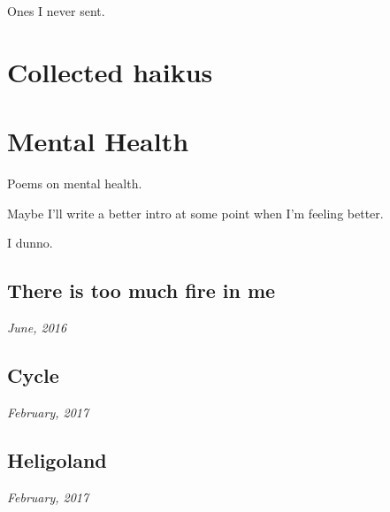 \documentclass[10pt]{memoir}
\begin{document}
  \hfill Ones I never sent.
  \thispagestyle{empty}
  \newpage


  


  \chapter{Collected haikus}
  \thispagestyle{empty}
  \newpage


  


  \chapter{Mental Health}

  Poems on mental health.

  \vfill

  \noindent Maybe I'll write a better intro at some point when I'm feeling better.

  \vfill

  \hfill I dunno.
  \thispagestyle{empty}
  \newpage


  \section{There is too much fire in me}

  \hfill\textit{June, 2016}

  
  \newpage


  \section{Cycle}

  \hfill\textit{February, 2017}

  
  \newpage


  \section{Heligoland}

  \hfill\textit{February, 2017}

  
\end{document}
